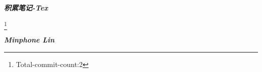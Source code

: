 
\begin{titlepage}
    \vspace*{\fill}
    \begin{center}
        {\Huge\textsl{\textbf{积累笔记-Tex}}}

        \bigskip
        {}\footnote{Total-commit-count:2} %

        \bigskip
        {\small\textsl{\textbf{Minphone Lin}}}

    \end{center}
\end{titlepage}


